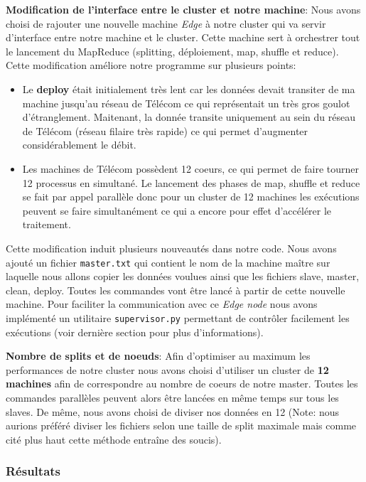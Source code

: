 \documentclass{article}
\begin{document}
\textbf{Modification de l'interface entre le cluster et notre machine}: Nous avons choisi de rajouter une nouvelle machine \textit{Edge} à notre cluster
qui va servir d'interface entre notre machine et le cluster. Cette machine sert à orchestrer tout le lancement du MapReduce (splitting, déploiement, map, shuffle et reduce).
Cette modification améliore notre programme sur plusieurs points:
\begin{itemize}
    \item Le \textbf{deploy} était initialement très lent car les données devait transiter de ma machine jusqu'au réseau de Télécom ce qui représentait un très gros goulot d'étranglement. Maitenant,
    la donnée transite uniquement au sein du réseau de Télécom (réseau filaire très rapide) ce qui permet d'augmenter considérablement le débit.
    \item Les machines de Télécom possèdent 12 coeurs, ce qui permet de faire tourner 12 processus en simultané. Le lancement des phases de map, shuffle et reduce se fait par appel parallèle donc pour un cluster de 12 machines
    les exécutions peuvent se faire simultanément ce qui a encore pour effet d'accélérer le traitement.
\end{itemize}

Cette modification induit plusieurs nouveautés dans notre code. Nous avons ajouté un fichier \texttt{master.txt} qui contient le nom de la machine maître sur laquelle
nous allons copier les données voulues ainsi que les fichiers slave, master, clean, deploy. Toutes les commandes vont être lancé à partir de cette nouvelle machine. Pour faciliter
la communication avec ce \textit{Edge node} nous avons implémenté un utilitaire \texttt{supervisor.py} permettant de contrôler facilement les exécutions (voir dernière section pour plus d'informations).

\textbf{Nombre de splits et de noeuds}: Afin d'optimiser au maximum les performances de notre cluster nous avons choisi d'utiliser un cluster de \textbf{12 machines} afin de correspondre au nombre de coeurs
de notre master. Toutes les commandes parallèles peuvent alors être lancées en même temps sur tous les slaves. De même, nous avons choisi de diviser nos données en 12 (Note: nous aurions préféré diviser les fichiers
selon une taille de split maximale mais comme cité plus haut cette méthode entraîne des soucis).
\subsubsection{Résultats}
\end{document}
